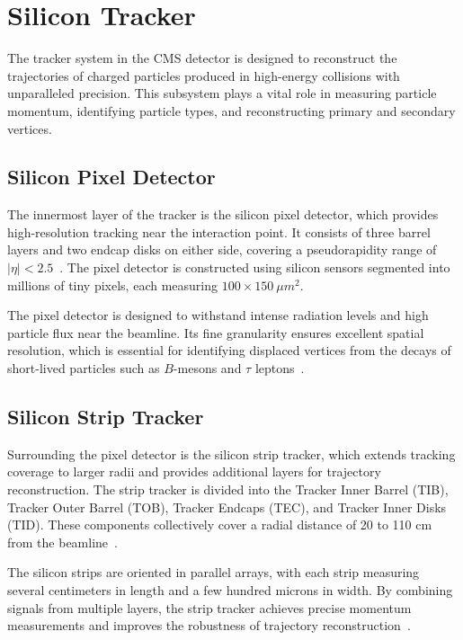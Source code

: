 \section{Silicon Tracker}

The tracker system in the CMS detector is designed to reconstruct the trajectories of charged particles produced in high-energy collisions with unparalleled precision. This subsystem plays a vital role in measuring particle momentum, identifying particle types, and reconstructing primary and secondary vertices.

\subsection{Silicon Pixel Detector}
The innermost layer of the tracker is the silicon pixel detector, which provides high-resolution tracking near the interaction point. It consists of three barrel layers and two endcap disks on either side, covering a pseudorapidity range of $|\eta| < 2.5$~\cite{tracker_tdr}. The pixel detector is constructed using silicon sensors segmented into millions of tiny pixels, each measuring $100\times150~\mu m^2$.

The pixel detector is designed to withstand intense radiation levels and high particle flux near the beamline. Its fine granularity ensures excellent spatial resolution, which is essential for identifying displaced vertices from the decays of short-lived particles such as $B$-mesons and $ \tau $ leptons~\cite{pixels}.

\subsection{Silicon Strip Tracker}
Surrounding the pixel detector is the silicon strip tracker, which extends tracking coverage to larger radii and provides additional layers for trajectory reconstruction. The strip tracker is divided into the Tracker Inner Barrel (TIB), Tracker Outer Barrel (TOB), Tracker Endcaps (TEC), and Tracker Inner Disks (TID). These components collectively cover a radial distance of 20 to 110 cm from the beamline~\cite{tracker_tdr}.

The silicon strips are oriented in parallel arrays, with each strip measuring several centimeters in length and a few hundred microns in width. By combining signals from multiple layers, the strip tracker achieves precise momentum measurements and improves the robustness of trajectory reconstruction~\cite{strips}.

